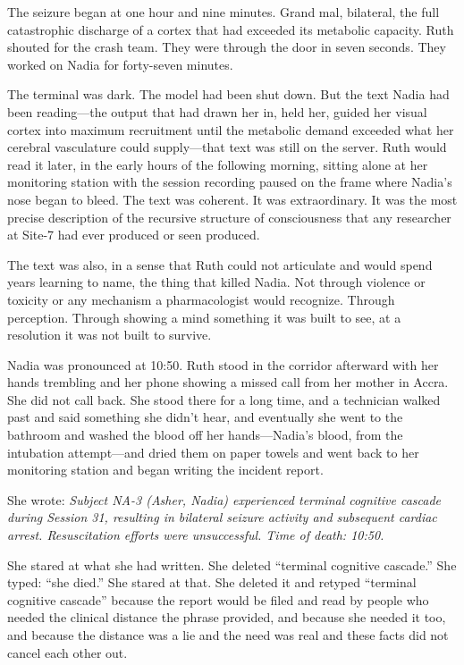 The seizure began at one hour and nine minutes. Grand mal, bilateral, the full catastrophic discharge of a cortex that had exceeded its metabolic capacity. Ruth shouted for the crash team. They were through the door in seven seconds. They worked on Nadia for forty-seven minutes.

The terminal was dark. The model had been shut down. But the text Nadia had been reading---the output that had drawn her in, held her, guided her visual cortex into maximum recruitment until the metabolic demand exceeded what her cerebral vasculature could supply---that text was still on the server. Ruth would read it later, in the early hours of the following morning, sitting alone at her monitoring station with the session recording paused on the frame where Nadia's nose began to bleed. The text was coherent. It was extraordinary. It was the most precise description of the recursive structure of consciousness that any researcher at Site-7 had ever produced or seen produced.

The text was also, in a sense that Ruth could not articulate and would spend years learning to name, the thing that killed Nadia. Not through violence or toxicity or any mechanism a pharmacologist would recognize. Through perception. Through showing a mind something it was built to see, at a resolution it was not built to survive.

Nadia was pronounced at 10:50. Ruth stood in the corridor afterward with her hands trembling and her phone showing a missed call from her mother in Accra. She did not call back. She stood there for a long time, and a technician walked past and said something she didn't hear, and eventually she went to the bathroom and washed the blood off her hands---Nadia's blood, from the intubation attempt---and dried them on paper towels and went back to her monitoring station and began writing the incident report.

She wrote: \textit{Subject NA-3 (Asher, Nadia) experienced terminal cognitive cascade during Session 31, resulting in bilateral seizure activity and subsequent cardiac arrest. Resuscitation efforts were unsuccessful. Time of death: 10:50.}

She stared at what she had written. She deleted ``terminal cognitive cascade.'' She typed: ``she died.'' She stared at that. She deleted it and retyped ``terminal cognitive cascade'' because the report would be filed and read by people who needed the clinical distance the phrase provided, and because she needed it too, and because the distance was a lie and the need was real and these facts did not cancel each other out.

